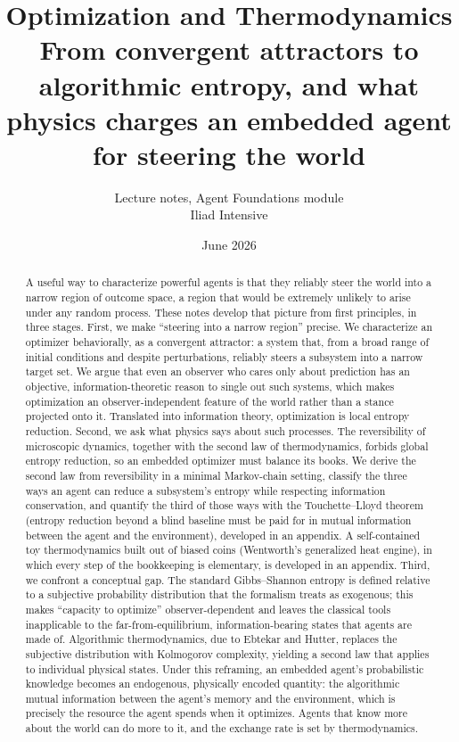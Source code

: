 \documentclass[10pt]{article}
\title{Optimization and Thermodynamics \\[1ex]
{\large From convergent attractors to algorithmic entropy, and what physics charges an embedded agent for steering the world}}
\author{Lecture notes, Agent Foundations module \\ Iliad Intensive}
\date{June 2026}
\theoremstyle{definition}
\theoremstyle{remark}
\begin{document}
\maketitle

\begin{abstract}
A useful way to characterize powerful agents is that they reliably steer the world into a narrow region of outcome space, a region that would be extremely unlikely to arise under any random process. These notes develop that picture from first principles, in three stages. First, we make ``steering into a narrow region'' precise. We characterize an optimizer behaviorally, as a convergent attractor: a system that, from a broad range of initial conditions and despite perturbations, reliably steers a subsystem into a narrow target set. We argue that even an observer who cares only about prediction has an objective, information-theoretic reason to single out such systems, which makes optimization an observer-independent feature of the world rather than a stance projected onto it. Translated into information theory, optimization is local entropy reduction. Second, we ask what physics says about such processes. The reversibility of microscopic dynamics, together with the second law of thermodynamics, forbids global entropy reduction, so an embedded optimizer must balance its books. We derive the second law from reversibility in a minimal Markov-chain setting, classify the three ways an agent can reduce a subsystem's entropy while respecting information conservation, and quantify the third of those ways with the Touchette--Lloyd theorem (entropy reduction beyond a blind baseline must be paid for in mutual information between the agent and the environment), developed in an appendix. A self-contained toy thermodynamics built out of biased coins (Wentworth's generalized heat engine), in which every step of the bookkeeping is elementary, is developed in an appendix. Third, we confront a conceptual gap. The standard Gibbs--Shannon entropy is defined relative to a subjective probability distribution that the formalism treats as exogenous; this makes ``capacity to optimize'' observer-dependent and leaves the classical tools inapplicable to the far-from-equilibrium, information-bearing states that agents are made of. Algorithmic thermodynamics, due to Ebtekar and Hutter, replaces the subjective distribution with Kolmogorov complexity, yielding a second law that applies to individual physical states. Under this reframing, an embedded agent's probabilistic knowledge becomes an endogenous, physically encoded quantity: the algorithmic mutual information between the agent's memory and the environment, which is precisely the resource the agent spends when it optimizes. Agents that know more about the world can do more to it, and the exchange rate is set by thermodynamics.
\end{abstract}
\end{document}
